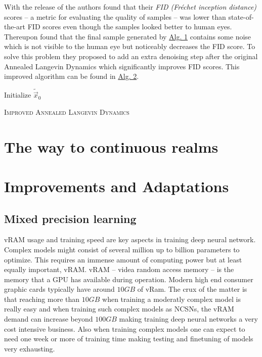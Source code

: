 With the release of \cite{score_1} the authors found that their \textit{FID (Fréchet inception distance)} \cite{fid} scores – a metric for evaluating the quality of samples – was lower than state-of-the-art FID scores even though the samples looked better to human eyes. Thereupon \cite{score_4} found that the final sample generated by \hyperref[alg:1]{Alg. 1} contains some noise which is not visible to the human eye but noticeably decreases the FID score. To solve this problem they proposed to add an extra denoising step after the original Annealed Langevin Dynamics which significantly improves FID scores. This improved algorithm can be found in \hyperref[alg:2]{Alg. 2}.
%
\begin{algorithm} \label{alg:2}
    \DontPrintSemicolon
    Initialize $\tilde{\vec{x}}_0$\;
    
    \caption{\textsc{Improved Annealed Langevin Dynamics}}
\end{algorithm}
\section[The way to continuous realms]{The way to continuous realms%
    } \label{sec:3.3}

\section{Improvements and Adaptations}
\subsection{Mixed precision learning} %
vRAM usage and training speed are key aspects in training deep neural network. Complex models might consist of several million up to billion parameters to optimize. This requires an immense amount of computing power but at least equally important, vRAM. vRAM – videa random access memory – is the memory that a GPU has available during operation. Modern high end consumer graphic cards typically have around $10GB$ of vRam. The crux of the matter is that reaching more than $10GB$ when training a moderatly complex model is really easy and when training such complex models as NCSNs, the vRAM demand can increase beyond $100GB$ making training deep neural networks a very cost intensive business. Also when training complex models one can expect to need one week or more of training time making testing and finetuning of models very exhausting.

